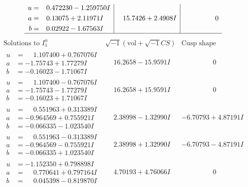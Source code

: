 \documentclass[1p]{elsarticle_modified}
\theoremstyle{definition}
\newcommand{\I}{\sqrt{-1}}
\begin{document}
$$\begin{array}{c|c|c}
\begin{aligned}
u &= \phantom{-}0.472230 - 1.259750 I \\
a &= \phantom{-}0.13075 + 2.11971 I \\
b &= \phantom{-}0.02922 - 1.67563 I\end{aligned}
 & \phantom{-}15.7426 + 2.4908 I & \phantom{-0.000000 } 0\\
 \hline 
 \end{array}$$\newpage$$\begin{array}{c|c|c}  
\text{Solutions to }I^u_{1}& \I (\text{vol} + \sqrt{-1}CS) & \text{Cusp shape}\\
 \hline 
\begin{aligned}
u &= \phantom{-}1.107400 + 0.767076 I \\
a &= -1.75743 + 1.77279 I \\
b &= -0.16023 - 1.71067 I\end{aligned}
 & \phantom{-}16.2658 - 15.9591 I & \phantom{-0.000000 } 0 \\ \hline\begin{aligned}
u &= \phantom{-}1.107400 - 0.767076 I \\
a &= -1.75743 - 1.77279 I \\
b &= -0.16023 + 1.71067 I\end{aligned}
 & \phantom{-}16.2658 + 15.9591 I & \phantom{-0.000000 } 0 \\ \hline\begin{aligned}
u &= \phantom{-}0.551963 + 0.313389 I \\
a &= -0.964569 + 0.755921 I \\
b &= -0.066335 - 1.023540 I\end{aligned}
 & \phantom{-}2.38998 - 1.32990 I & -6.70793 + 4.87191 I \\ \hline\begin{aligned}
u &= \phantom{-}0.551963 - 0.313389 I \\
a &= -0.964569 - 0.755921 I \\
b &= -0.066335 + 1.023540 I\end{aligned}
 & \phantom{-}2.38998 + 1.32990 I & -6.70793 - 4.87191 I \\ \hline\begin{aligned}
u &= -1.152350 + 0.798898 I \\
a &= \phantom{-}0.770641 + 0.797164 I \\
b &= \phantom{-}0.045398 - 0.819870 I\end{aligned}
 & \phantom{-}4.70193 + 4.76066 I & \phantom{-0.000000 } 0 \\ \hline\begin{aligned}

\end{aligned}
\end{array}$$
\end{document}
